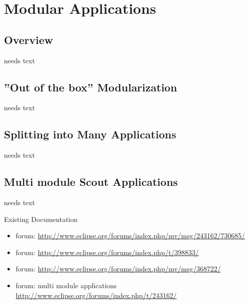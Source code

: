 \documentclass[a4paper,10pt,twoside]{book}
\begin{document}
  \sloppy
\fi


\chapter{Modular Applications}

\section{Overview}
needs text

\section{''Out of the box'' Modularization}
needs text

\section{Splitting into Many Applications}
needs text

\section{Multi module Scout Applications}
needs text

\noindent Existing Documentation
\begin{itemize}
  \item forum: \url{http://www.eclipse.org/forums/index.php/mv/msg/243162/730685/}
  \item forum: \url{http://www.eclipse.org/forums/index.php/t/398833/}
  \item forum: \url{http://www.eclipse.org/forums/index.php/mv/msg/368722/}
  \item forum: multi module applications \url{http://www.eclipse.org/forums/index.php/t/243162/}
\end{itemize}


\ifx\wholebook\relax\else
   
   
\end{document}
